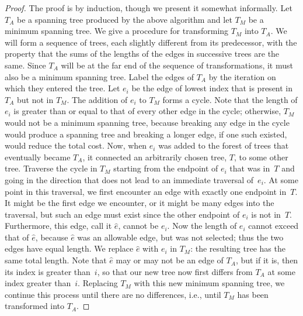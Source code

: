 \documentclass[11pt]{article}
\begin{document}
\begin{proof}
  The proof is by induction, though we present it somewhat informally.  Let
  $T_A$ be a spanning tree produced by the above algorithm and let $T_M$ be a
  minimum spanning tree.  We give a procedure for transforming $T_M$ into
  $T_A$.  We will form a sequence of trees, each slightly different from its
  predecessor, with the property that the sums of the lengths of the edges in
  successive trees are the same.  Since $T_A$ will be at the far end of the
  sequence of transformations, it must also be a minimum spanning tree.  Label
  the edges of $T_A$ by the iteration on which they entered the tree.  Let
  $e_i$ be the edge of lowest index that is present in $T_A$ but not in $T_M$.
  The addition of $e_i$ to $T_M$ forms a cycle.  Note that the length of $e_i$
  is greater than or equal to that of every other edge in the cycle; otherwise,
  $T_M$ would not be a minimum spanning tree, because breaking any edge in the
  cycle would produce a spanning tree and breaking a longer edge, if one such
  existed, would reduce the total cost.  Now, when $e_i$ was added to the
  forest of trees that eventually became $T_A$, it connected an arbitrarily
  chosen tree, $T$, to some other tree.  Traverse the cycle in $T_M$ starting
  from the endpoint of $e_i$ that was in~$T$ and going in the direction that
  does not lead to an immediate traversal of~$e_i$.  At some point in this
  traversal, we first encounter an edge with exactly one endpoint in~$T$.  It
  might be the first edge we encounter, or it might be many edges into the
  traversal, but such an edge must exist since the other endpoint of $e_i$ is
  not in~$T$.  Furthermore, this edge, call it $\hat{e}$, cannot be $e_i$.  Now
  the length of $e_i$ cannot exceed that of $\hat{e}$, because $\hat{e}$ was an
  allowable edge, but was not selected; thus the two edges have equal length.
  We replace $\hat{e}$ with $e_i$ in $T_M$: the resulting tree has the same
  total length.  Note that $\hat{e}$ may or may not be an edge of $T_A$, but if
  it is, then its index is greater than~$i$, so that our new tree now first
  differs from $T_A$ at some index greater than~$i$.  Replacing $T_M$ with this
  new minimum spanning tree, we continue this process until there are no
  differences, i.e., until $T_M$ has been transformed into $T_A$.
\end{proof}
\end{document}
